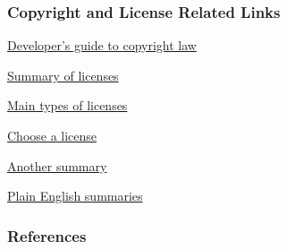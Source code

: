 \documentclass[t,12pt,numbers,fleqn]{beamer}
\begin{document}

\begin{frame}
\frametitle{Copyright and License Related Links}

\bi
\item
  \href{http://haacked.com/archive/2006/01/24/TheDevelopersGuideToCopyrightLaw-Part1.aspx/}{Developer's
    guide to copyright law}

\item \href{https://www.smashingmagazine.com/2010/03/a-short-guide-to-open-source-and-similar-licenses/}{Summary of licenses}

\item
  \href{http://haacked.com/archive/2007/04/04/there-are-only-four-software-licenses.aspx/}{Main
    types of licenses}

\item \href{http://choosealicense.com}{Choose a license}
\item \href{http://choosealicense.com/licenses/}{Another summary}
\item \href{https://tldrlegal.com}{Plain English summaries}

\ei

\end{frame}


\begin{frame}[allowframebreaks]
\frametitle{References}



\end{frame}

\end{document}
